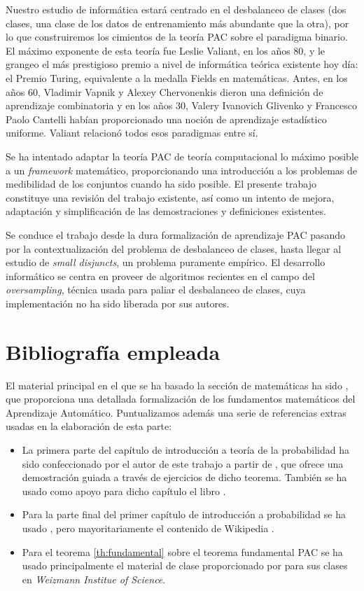  Nuestro estudio de informática estará centrado en el desbalanceo de clases (dos clases, una clase de los datos de entrenamiento más 
 abundante que la otra), por lo que construiremos los cimientos de la teoría PAC sobre el paradigma binario. El máximo exponente
 de esta teoría fue Leslie Valiant, en los años 80, y le grangeo el más prestigioso premio a nivel de informática teórica
 existente hoy día: el Premio Turing, equivalente a la medalla Fields en matemáticas. Antes, en los años 60, Vladimir Vapnik y 
 Alexey Chervonenkis dieron una definición de aprendizaje combinatoria y en los años 30, Valery Ivanovich Glivenko y Francesco
 Paolo Cantelli habían proporcionado una noción de aprendizaje estadístico uniforme. Valiant relacionó todos esos paradigmas
 entre sí.
 
 Se ha intentado adaptar la teoría PAC de teoría computacional lo máximo posible a un \textit{framework} matemático, proporcionando
 una introducción a los problemas de medibilidad de los conjuntos cuando ha sido posible. El presente trabajo constituye una
 revisión del trabajo existente, así como un intento de mejora, adaptación y simplificación de las demostraciones y definiciones
 existentes.
 
 Se conduce el trabajo desde la dura formalización de aprendizaje PAC pasando por la contextualización del problema de 
 desbalanceo de clases, hasta llegar al estudio de \textit{small disjuncts}, un problema puramente empírico. El desarrollo
 informático se centra en proveer de algoritmos recientes en el campo del \textit{oversampling}, técnica usada para paliar
 el desbalanceo de clases, cuya implementación no ha sido liberada por sus autores.
 
  \section{Bibliografía empleada}
  El material principal en el que se ha basado la sección de matemáticas ha sido \citep{shalev}, 
  que proporciona una detallada formalización de los fundamentos matemáticos del Aprendizaje Automático. Puntualizamos además
  una serie de referencias extras usadas en la elaboración de esta parte:
  
  \begin{itemize} 
   \item La primera parte del capítulo de introducción a teoría de la probabilidad ha sido confeccionado por el autor de 
   este trabajo a partir de \citep{caratheodory}, que ofrece una demostración guiada a través de ejercicios de dicho teorema. 
   También se ha usado como apoyo para dicho capítulo el libro \citep{loeve}. 
   \item Para la parte final del primer capítulo de introducción a probabilidad se ha usado \citep{shalev}, pero
   mayoritariamente el contenido de Wikipedia \citep{wiki:markov, wiki:hoeff_lemma, wiki:hoeffding}.
   \item Para el teorema \ref{th:fundamental} sobre el teorema fundamental PAC se ha usado principalmente el material de clase
   proporcionado por \citep{slfetaya} para sus clases en \textit{Weizmann Institue of Science}.
  \end{itemize}
   
